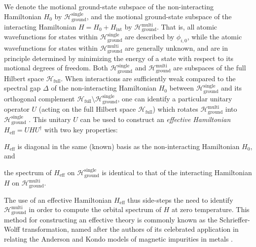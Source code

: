 \documentclass[preprint,showkeys,nofootinbib]{revtex4-1}
\renewcommand{\t}{\text} %
\renewcommand{\H}{\mathcal{H}}
\newcommand{\1}{\mathds{1}}
\begin{document}
We denote the motional ground-state subspace of the non-interacting
Hamiltonian $H_0$ by $\H_{\t{ground}}^{\t{single}}$, and the motional
ground-state subspace of the interacting Hamiltonian
$H = H_0 + H_{\t{int}}$ by $\H_{\t{ground}}^{\t{multi}}$.  That is,
all atomic wavefunctions for states within
$\H_{\t{ground}}^{\t{single}}$ are described by $\phi_{i,0}$, while
the atomic wavefunctions for states within
$\H_{\t{ground}}^{\t{multi}}$ are generally unknown, and are in
principle determined by minimizing the energy of a state with respect
to its motional degrees of freedom.  Both
$\H_{\t{ground}}^{\t{single}}$ and $\H_{\t{ground}}^{\t{multi}}$ are
subspaces of the full Hilbert space $\H_{\t{full}}$.  When
interactions are sufficiently weak compared to the spectral gap
$\Delta$ of the non-interacting Hamiltonian $H_0$ between
$\H_{\t{ground}}^{\t{single}}$ and its orthogonal complement
$\H_{\t{full}}\setminus\H_{\t{ground}}^{\t{single}}$, one can identify
a particular unitary operator $U$ (acting on the full Hilbert space
$\H_{\t{full}}$) which rotates $\H_{\t{ground}}^{\t{multi}}$ into
$\H_{\t{ground}}^{\t{single}}$ \cite{bravyi2011schrieffer}.  This
unitary $U$ can be used to construct an {\it effective Hamiltonian}
$H_{\t{eff}} = U H U^\dag$ with two key properties:
\begin{enumerate*}
\item $H_{\t{eff}}$ is diagonal in the same (known) basis as the
  non-interacting Hamiltonian $H_0$, and
\item the spectrum of $H_{\t{eff}}$ on $\H_{\t{ground}}^{\t{single}}$
  is identical to that of the interacting Hamiltonian $H$ on
  $\H_{\t{ground}}^{\t{multi}}$.
\end{enumerate*}
The use of an effective Hamiltonian $H_{\t{eff}}$ thus side-steps the
need to identify $\H_{\t{ground}}^{\t{multi}}$ in order to compute the
orbital spectrum of $H$ at zero temperature.  This method for
constructing an effective theory is commonly known as the
Schrieffer-Wolff transformation, named after the authors of its
celebrated application in relating the Anderson and Kondo models of
magnetic impurities in metals \cite{schrieffer1966relation}.
\end{document}
